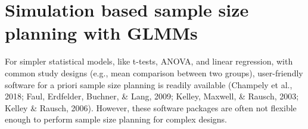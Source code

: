 \documentclass[
  man,floatsintext]{apa6}
\begin{document}
\hypertarget{simulation-based-sample-size-planning-with-glmms}{%
\section{Simulation based sample size planning with GLMMs}\label{simulation-based-sample-size-planning-with-glmms}}

For simpler statistical models, like t-tests, ANOVA, and linear regression, with common study designs (e.g., mean comparison between two groups), user-friendly software for a priori sample size planning is readily available (Champely et al., 2018; Faul, Erdfelder, Buchner, \& Lang, 2009; Kelley, Maxwell, \& Rausch, 2003; Kelley \& Rausch, 2006).
However, these software packages are often not flexible enough to perform sample size planning for complex designs.
\end{document}
